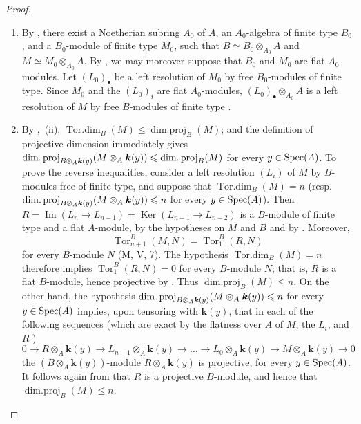 \begin{proof}
\begin{enumerate}[label=(\roman*)]
  \item By , there exist a Noetherian subring $A_0$ of $A$, an $A_0$-algebra of finite type $B_0$, and a $B_0$-module of finite type $M_0$, such that $B\simeq B_0\otimes_{A_0}A$ and $M\simeq M_0\otimes_{A_0}A$.
  By , we may moreover suppose that $B_0$ and $M_0$ are flat $A_0$-modules.
  Let $(L_0)_\bullet$ be a left resolution of $M_0$ by free $B_0$-modules of finite type.
  Since $M_0$ and the $(L_0)_i$ are flat $A_0$-modules, $(L_0)_\bullet\otimes_{A_0}A$ is a left resolution of $M$ by free $B$-modules of finite type .

  \item By ,~(ii),
  $\operatorname{Tor.dim}_B(M)\leqslant\operatorname{dim.proj}_B(M)$; and the definition of projective dimension immediately gives $\operatorname{dim.proj}_{B\otimes_A\boldsymbol{k}(y)}(M\otimes_A\boldsymbol{k}(y))
\leqslant \operatorname{dim.proj}_B(M)$
  for every $y\in\operatorname{Spec}(A)$.
  To prove the reverse inequalities, consider a left resolution $(L_i)$ of $M$ by $B$-modules free of finite type, and suppose that $\operatorname{Tor.dim}_B(M)=n$ (resp.\ $\operatorname{dim.proj}_{B\otimes_A\boldsymbol{k}(y)}(M\otimes_A\boldsymbol{k}(y))\leqslant n$ for every $y\in\operatorname{Spec}(A)$).
  Then
  $R=\operatorname{Im}(L_n\to L_{n-1})=\operatorname{Ker}(L_{n-1}\to L_{n-2})$
  is a $B$-module of finite type and a flat $A$-module, by the hypotheses on $M$ and $B$ and by .
  Moreover,
  \[
    \operatorname{Tor}_{n+1}^B(M,N)=\operatorname{Tor}_1^B(R,N)
  \]
  for every $B$-module $N$ (M, V, 7).
  The hypothesis $\operatorname{Tor.dim}_B(M)=n$ therefore implies $\operatorname{Tor}_1^B(R,N)=0$ for every $B$-module $N$; that is, $R$ is a flat $B$-module, hence projective by .
  Thus $\operatorname{dim.proj}_B(M)\leqslant n$.
  On the other hand, the hypothesis $\operatorname{dim.proj}_{B\otimes_A\boldsymbol{k}(y)}(M\otimes_A\boldsymbol{k}(y))\leqslant n$ for every $y\in\operatorname{Spec}(A)$ implies, upon tensoring with $\boldsymbol{k}(y)$, that in each of the following sequences (which are exact by the flatness over $A$ of $M$, the $L_i$, and $R$ )
  \[
    0\to R\otimes_A\boldsymbol{k}(y)\to L_{n-1}\otimes_A\boldsymbol{k}(y)\to\ldots\to L_0\otimes_A\boldsymbol{k}(y)\to M\otimes_A\boldsymbol{k}(y)\to 0
  \]
  the $(B\otimes_A\boldsymbol{k}(y))$-module $R\otimes_A\boldsymbol{k}(y)$ is projective, for every $y\in\operatorname{Spec}(A)$.
  It follows again from  that $R$ is a projective $B$-module, and hence that $\operatorname{dim.proj}_B(M)\leqslant n$.
\end{enumerate}
\end{proof}

